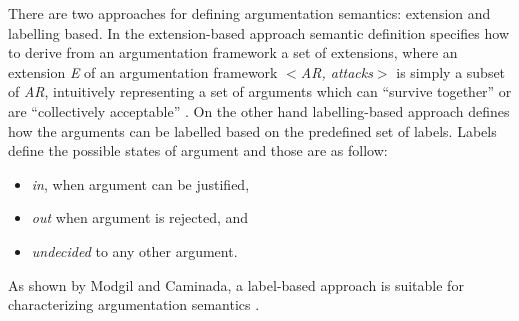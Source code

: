 There are two approaches for defining argumentation semantics: extension and labelling based. In the extension-based approach semantic definition specifies how to derive from an argumentation framework a set of extensions, where an extension \textit{E} of an argumentation framework $<$\textit{AR, attacks}$>$ is simply a subset of \textit{AR}, intuitively representing a set of arguments which can “survive together” or are “collectively acceptable” \citep{baroni2009semantics}. On the other hand labelling-based approach defines how the arguments can be labelled based on the predefined set of labels. Labels define the possible states of argument and those are as follow: 
\begin{itemize}
	\item \textit{in}, when argument can be justified, 
	\item \textit{out} when argument is rejected, and 
	\item \textit{undecided} to any other argument.
\end{itemize}

As shown by Modgil and Caminada, a label-based approach is suitable for characterizing argumentation semantics \citep{modgil2009proof}.